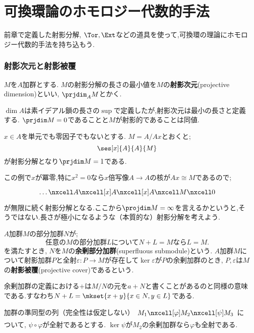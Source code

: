 \part[Homological method to ring theory]{可換環論のホモロジー代数的手法}
前章で定義した射影分解, $\Tor,\Ext$などの道具を使って,可換環の理論にホモロジー代数的手法を持ち込もう.
\section{射影次元と射影被覆}
\begin{defi}[射影次元]
	$M$を$A$加群とする. $M$の射影分解の長さの最小値を$M$の\textbf{射影次元}(projective dimension)といい, $\prjdim_A M$とかく.
\end{defi}

$\dim A$は素イデアル鎖の長さの$\sup$で定義したが,射影次元は最小の長さと定義する. $\prjdim M=0$であることと$M$が射影的であることは同値.

\begin{ex}
	$x\in A$を単元でも零因子でもないとする. $M=A/Ax$とおくと;
	\[\ses[x]{A}{A}{M}\]
	が射影分解となり$\prjdim M=1$である.
\end{ex}

この例で$x$が冪零,特に$x^2=0$なら$x$倍写像$A\to A$の核が$Ax\cong M$であるので;
\[\begin{tikzcd}
	\dots\nxcell A\nxcell[x]A\nxcell[x] A\nxcell M\nxcell0
\end{tikzcd}\]
が無限に続く射影分解となる.ここから$\projdim M=\infty$を言えるかというと,そうではない.長さが極小になるような（本質的な）射影分解を考えよう.

\begin{defi}[射影被覆]
	$A$加群$M$の部分加群$N$が;
	\[\text{任意の$M$の部分加群$L$について$N+L=M$なら$L=M$.}\]
	を満たすとき, $N$を$M$の\textbf{余剰部分加群}(superfluous submodule)という. $A$加群$M$について射影加群$P$と全射$\varepsilon:P\to M$が存在して$\ker\varepsilon$が$P$の余剰加群のとき, $P,\varepsilon$は$M$の\textbf{射影被覆}(projective cover)であるという. 
\end{defi}

余剰加群の定義における$+$は$M/N$の元を$a+N$と書くことがあるのと同様の意味である.すなわち$N+L=\mkset{x+y}{x\in N,y\in L}$である.

\begin{lem}\label{lem:余剰加群の補題}
	加群の準同型の列（完全性は仮定しない）$\begin{tikzcd}
	M_1\nxcell[\varphi]M_2\nxcell[\psi]M_3
	\end{tikzcd}$について, $\psi\circ\varphi$が全射であるとする. $\ker\psi $が$M_2$の余剰加群なら$\varphi$も全射である.
\end{lem}

